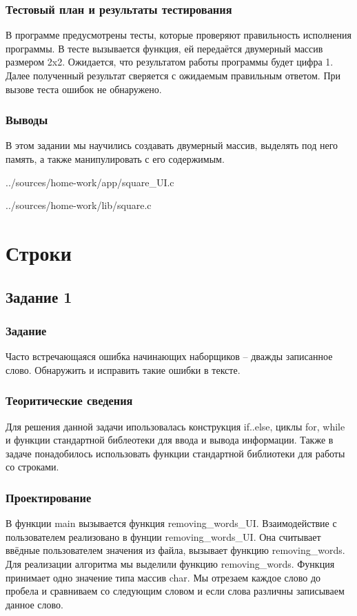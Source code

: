 \documentclass[12pt,a4paper]{report}
\begin{document}
\subsection{Тестовый план и результаты тестирования}
В программе предусмотрены тесты, которые проверяют правильность исполнения программы. В тесте вызывается функция, ей передаётся двумерный массив размером 2x2. Ожидается, что результатом работы программы будет цифра 1. Далее полученный результат сверяется с ожидаемым правильным ответом. При вызове теста ошибок не обнаружено.
\subsection{Выводы}
В этом задании мы научились создавать двумерный массив, выделять под него память, а также манипулировать с его содержимым.

{../sources/home-work/app/square_UI.c}


{../sources/home-work/lib/square.c}
\chapter{Строки}
\section{Задание 1}
\subsection{Задание}
Часто встречающаяся ошибка начинающих наборщиков – дважды записанное слово. Обнаружить и исправить такие ошибки в тексте.
\subsection{Теоритические сведения}
Для решения данной задачи ипользовалась конструкция if..else, циклы for, while и функции стандартной библеотеки для ввода и вывода информации. Также в задаче понадобилось использовать функции стандартной библиотеки для работы со строками.
\subsection{Проектирование}
В функции main вызывается функция removing\_words\_UI. Взаимодействие с пользователем реализовано в фунции removing\_words\_UI. Она считывает ввёдные пользователем значения из файла, вызывает функцию removing\_words. Для реализации алгоритма мы выделили функцию removing\_words. Функция принимает одно значение типа массив char. Мы отрезаем каждое слово до пробела и сравниваем со следующим словом и если слова различны записываем данное слово.
\end{document}
